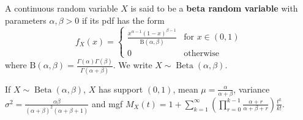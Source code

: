 \begin{definition}
	A continuous random variable $X$ is said to be a \textbf{beta random variable} with parameters $\alpha,\beta>0$ if its pdf has the form
	$$f_X(x)=\begin{cases}
		\frac{x^{\alpha-1}(1-x)^{\beta-1}} {\mathrm{B}(\alpha,\beta)} & \text{for $x\in(0,1)$}\\
		0 & \text{otherwise}
	\end{cases}$$
	where $\mathrm{B}(\alpha,\beta) = \frac{\Gamma(\alpha)\Gamma(\beta)}{\Gamma(\alpha + \beta)}$. We write $X\sim \operatorname{Beta}(\alpha,\beta)$.
\end{definition}

If $X\sim \operatorname{Beta}(\alpha,\beta)$, $X$ has support $(0,1)$, mean $\mu=\frac{\alpha}{\alpha + \beta}$, variance $\sigma^2=\frac{\alpha\beta}{(\alpha+\beta)^2(\alpha+\beta+1)}$ and mgf $M_X(t)=1+\sum_{k=1}^{\infty} \left( \prod_{r=0}^{k-1} \frac{\alpha+r}{\alpha+\beta+r} \right) \frac{t^k}{k!}$.
